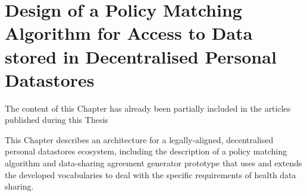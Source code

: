 \chapter{Design of a Policy Matching Algorithm for Access to Data stored in Decentralised Personal Datastores}
\label{chap:matching}

\begin{tcolorbox}[colback=royallavender!40]
The content of this Chapter has already been partially included in the articles published during this Thesis %
\end{tcolorbox}

This Chapter describes an architecture for a legally-aligned, decentralised personal datastores ecosystem, including the description of a policy matching algorithm and data-sharing agreement generator prototype that uses and extends the developed vocabularies to deal with the specific requirements of health data sharing.
% 
% 
% 
